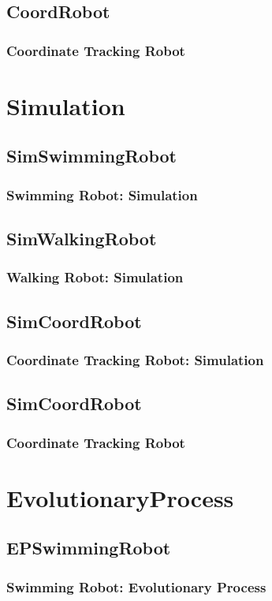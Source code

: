 \documentclass{beamer}
\begin{document}
\subsection{CoordRobot}
\begin{frame}
  \frametitle{Coordinate Tracking Robot}
\end{frame}

\section{Simulation}

\subsection{SimSwimmingRobot}
\begin{frame}
  \frametitle{Swimming Robot: Simulation}
\end{frame}

\subsection{SimWalkingRobot}
\begin{frame}
  \frametitle{Walking Robot: Simulation}
\end{frame}

\subsection{SimCoordRobot}
\begin{frame}
  \frametitle{Coordinate Tracking Robot: Simulation}
\end{frame}

\subsection{SimCoordRobot}
\begin{frame}
  \frametitle{Coordinate Tracking Robot}
\end{frame}

\section{EvolutionaryProcess}

\subsection{EPSwimmingRobot}
\begin{frame}
  \frametitle{Swimming Robot: Evolutionary Process}
\end{frame}
\end{document}
